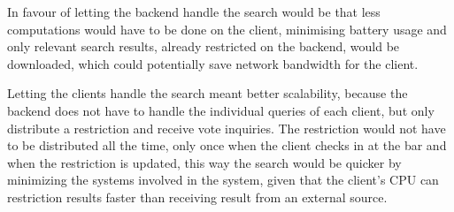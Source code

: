 In favour of letting the backend handle the search would be that less computations would have to be done on the client, minimising battery usage and only relevant search results, already restricted on the backend, would be downloaded, which could potentially save network bandwidth for the client.

Letting the clients handle the search meant better scalability, because the backend does not have to handle the individual queries of each client, but only distribute a restriction and receive vote inquiries. The restriction would not have to be distributed all the time, only once when the client checks in at the bar and when the restriction is updated, this way the search would be quicker by minimizing the systems involved in the system, given that the client's CPU can restriction results faster than receiving result from an external source.
